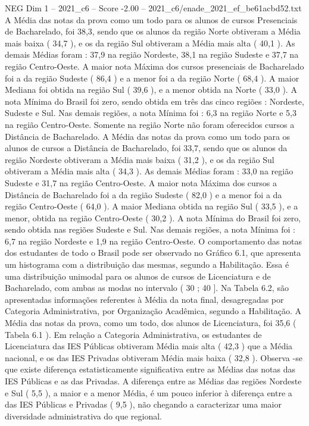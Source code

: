 \begin{textsample}{NEG Dim 1 – 2021\_c6 – Score -2.00 – 2021\_c6/enade\_2021\_ef\_be61acbd52.txt}
A Média das notas da prova como um todo para os alunos de cursos Presenciais de Bacharelado, foi 38,3, sendo que os alunos da região Norte obtiveram a Média mais baixa ( 34,7 ), e os da região Sul obtiveram a Média mais alta ( 40,1 ).
As demais Médias foram : 37,9 na região Nordeste, 38,1 na região Sudeste e 37,7 na região Centro-Oeste.
A maior nota Máxima dos cursos presenciais de Bacharelado foi a da região Sudeste ( 86,4 ) e a menor foi a da região Norte ( 68,4 ).
A maior Mediana foi obtida na região Sul ( 39,6 ), e a menor obtida na Norte ( 33,0 ).
A nota Mínima do Brasil foi zero, sendo obtida em três das cinco regiões : Nordeste, Sudeste e Sul.
Nas demais regiões, a nota Mínima foi : 6,3 na região Norte e 5,3 na região Centro-Oeste.
Somente na região Norte não foram oferecidos cursos a Distância de Bacharelado.
A Média das notas da prova como um todo para os alunos de cursos a Distância de Bacharelado, foi 33,7, sendo que os alunos da região Nordeste obtiveram a Média mais baixa ( 31,2 ), e os da região Sul obtiveram a Média mais alta ( 34,3 ).
As demais Médias foram : 33,0 na região Sudeste e 31,7 na região Centro-Oeste.
A maior nota Máxima dos cursos a Distância de Bacharelado foi a da região Sudeste ( 82,0 ) e a menor foi a da região Centro-Oeste ( 64,0 ).
A maior Mediana obtida na região Sul ( 33,5 ), e a menor, obtida na região Centro-Oeste ( 30,2 ).
A nota Mínima do Brasil foi zero, sendo obtida nas regiões Sudeste e Sul.
Nas demais regiões, a nota Mínima foi : 6,7 na região Nordeste e 1,9 na região Centro-Oeste.
O comportamento das notas dos estudantes de todo o Brasil pode ser observado no Gráfico 6.1, que apresenta um histograma com a distribuição das mesmas, segundo a Habilitação.
Essa é uma distribuição unimodal para os alunos de cursos de Licenciatura e de Bacharelado, com ambas as modas no intervalo ( 30 ; 40 ].
Na Tabela 6.2, são apresentadas informações referentes à Média da nota final, desagregadas por Categoria Administrativa, por Organização Acadêmica, segundo a Habilitação.
A Média das notas da prova, como um todo, dos alunos de Licenciatura, foi 35,6 ( Tabela 6.1 ).
Em relação a Categoria Administrativa, os estudantes de Licenciatura das IES Públicas obtiveram Média mais alta ( 42,3 ) que a Média nacional, e os das IES Privadas obtiveram Média mais baixa ( 32,8 ).
Observa -se que existe diferença estatisticamente significativa entre as Médias das notas das IES Públicas e as das Privadas.
A diferença entre as Médias das regiões Nordeste e Sul ( 5,5 ), a maior e a menor Média, é um pouco inferior à diferença entre a das IES Públicas e Privadas ( 9,5 ), não chegando a caracterizar uma maior diversidade administrativa do que regional.

\end{textsample}
